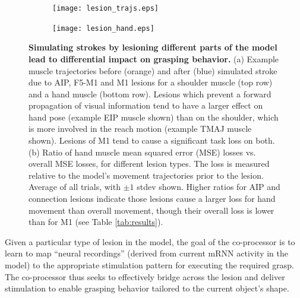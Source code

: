 \documentclass[12pt]{iopart}
\begin{document}
\begin{figure}[h]
	\centering
	\begin{subfigure}[c]{0.62\textwidth}
	    \centering
	    \texttt{[image: lesion\_trajs.eps]}
	    \caption{}
	\end{subfigure}
	\hfill
	\begin{subfigure}[c]{0.32\textwidth}
	    \centering
	    \texttt{[image: lesion\_hand.eps]}
	    \caption{}
	\end{subfigure}
	\hfill
	\caption{\textbf{Simulating strokes by lesioning different parts of the model
             lead to differential impact on grasping behavior.}
             (a) Example muscle trajectories before (orange) and after (blue)
             simulated stroke due to AIP, F5-M1 and M1 lesions for a shoulder
             muscle (top row) and a hand muscle (bottom row). Lesions which prevent
             a forward propagation of visual information tend to have a larger effect
             on hand pose (example EIP muscle shown) than on the shoulder, which is more
             involved in the reach motion (example TMAJ muscle shown). Lesions of M1
             tend to cause a significant task loss on both.
             (b) Ratio of hand muscle mean squared error (MSE) losses vs. overall MSE
             losses, for different lesion types. The loss is measured relative to the
             model's movement trajectories prior to the lesion. Average of all trials,
             with $\pm1$ stdev shown. Higher ratios for AIP and connection lesions indicate those
             lesions cause a larger loss for hand movement than overall movement, though
             their overall loss is lower than for M1 (see Table \ref{tab:results}).}
	\label{fig:lesion}
\end{figure}

Given a particular type of lesion in the model, the goal of the co-processor is to learn
to map ``neural recordings'' (derived from current mRNN  activity in the model)
to the appropriate stimulation pattern for executing the required grasp. The
co-processor thus seeks to effectively bridge across the lesion and deliver
stimulation to enable grasping behavior tailored to the current object's shape.
\end{document}

